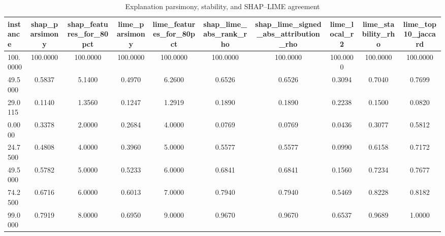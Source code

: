 \begin{table}
\centering
\caption{Explanation parsimony, stability, and SHAP--LIME agreement}
\label{tab:explanation_quality}
\begin{tabular}{lccccccccc}
\toprule
instance & shap_parsimony & shap_features_for_80pct & lime_parsimony & lime_features_for_80pct & shap_lime_abs_rank_rho & shap_lime_signed_abs_attribution_rho & lime_local_r2 & lime_stability_rho & lime_top10_jaccard \\
\midrule
100.0000 & 100.0000 & 100.0000 & 100.0000 & 100.0000 & 100.0000 & 100.0000 & 100.0000 & 100.0000 & 100.0000 \\
49.5000 & 0.5837 & 5.1400 & 0.4970 & 6.2600 & 0.6526 & 0.6526 & 0.3094 & 0.7040 & 0.7699 \\
29.0115 & 0.1140 & 1.3560 & 0.1247 & 1.2919 & 0.1890 & 0.1890 & 0.2238 & 0.1500 & 0.0820 \\
0.0000 & 0.3378 & 2.0000 & 0.2684 & 4.0000 & 0.0769 & 0.0769 & 0.0436 & 0.3077 & 0.5812 \\
24.7500 & 0.4808 & 4.0000 & 0.3960 & 5.0000 & 0.5577 & 0.5577 & 0.0990 & 0.6158 & 0.7172 \\
49.5000 & 0.5782 & 5.0000 & 0.5233 & 6.0000 & 0.6841 & 0.6841 & 0.1560 & 0.7234 & 0.7677 \\
74.2500 & 0.6716 & 6.0000 & 0.6013 & 7.0000 & 0.7940 & 0.7940 & 0.5469 & 0.8228 & 0.8182 \\
99.0000 & 0.7919 & 8.0000 & 0.6950 & 9.0000 & 0.9670 & 0.9670 & 0.6537 & 0.9689 & 1.0000 \\
\bottomrule
\end{tabular}
\end{table}
